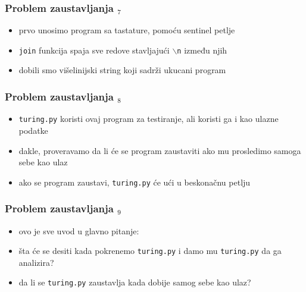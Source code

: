 \documentclass[utf8,compress,aspectratio=169]{beamer}
\begin{document}
\begin{frame}[fragile]
  \frametitle{Problem zaustavljanja $_7$}
  \begin{itemize}
    \item prvo unosimo program sa tastature, pomoću sentinel petlje
    \item \texttt{join} funkcija spaja sve redove stavljajući \texttt{$\backslash$n} između njih
    \item dobili smo višelinijski string koji sadrži ukucani program
  \end{itemize}
\end{frame}

\begin{frame}[fragile]
  \frametitle{Problem zaustavljanja $_8$}
  \begin{itemize}
    \item \texttt{turing.py} koristi ovaj program za testiranje, ali koristi ga i kao ulazne podatke
    \item dakle, proveravamo da li će se program zaustaviti ako mu prosledimo samoga sebe kao ulaz
    \item ako se program zaustavi, \texttt{turing.py} će ući u beskonačnu petlju
  \end{itemize}
\end{frame}

\begin{frame}[fragile]
  \frametitle{Problem zaustavljanja $_9$}
  \begin{itemize}
    \item ovo je sve uvod u glavno pitanje:
    \item šta će se desiti kada pokrenemo \texttt{turing.py} i damo mu \texttt{turing.py} da ga analizira?
    \item da li se \texttt{turing.py} zaustavlja kada dobije samog sebe kao ulaz?
  \end{itemize}
\end{frame}
\end{document}
